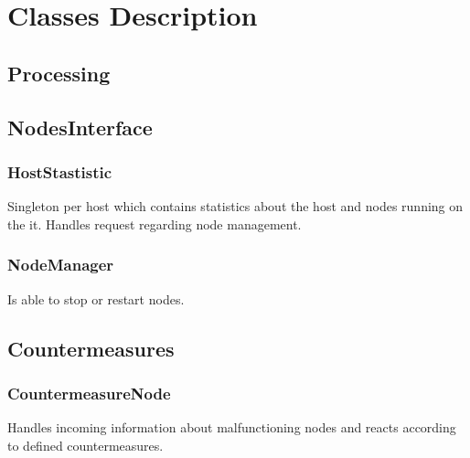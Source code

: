 \chapter{Classes Description}

\section{Processing}


\section{NodesInterface}

\subsection{HostStastistic}
Singleton per host which contains statistics about the host and nodes running on the it. Handles request regarding node management.

\subsection{NodeManager}
Is able to stop or restart nodes.


\section{Countermeasures}




\subsection{CountermeasureNode}
Handles incoming information about malfunctioning nodes and reacts according to defined countermeasures.



\newpage
